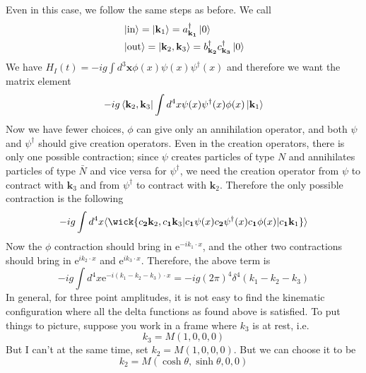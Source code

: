 \documentclass[11pt]{article}
\newcommand{\e}{\mathrm{e}}
\newcommand{\adag}[1]{a^\dagger_\mathbf{#1}}
\newcommand{\bdag}[1]{b^\dagger_\mathbf{#1}}
\renewcommand{\c}[1]{c_\mathbf{#1}}
\newcommand{\cdag}[1]{c^\dagger_\mathbf{#1}}
\numberwithin{equation}{section}
\begin{document}
    Even in this case, we follow the same steps as before. We call
    \begin{align*}
        &\ket{\text{in}} = \ket{\textbf{k}_1} = \adag{k_1}\ket{0}\\
        &\ket{\text{out}} = \ket{\textbf{k}_2, \textbf{k}_3} = \bdag{k_2}\cdag{k_3}\ket{0}
    \end{align*} 
    We have \(H_I(t) = -ig\int d^3\textbf{x} \phi(x) \psi(x) \psi^\dagger(x)\) and therefore we want the matrix element 
    \begin{equation*}
        -ig \bra{\textbf{k}_2, \textbf{k}_3} \int d^4x  \psi(x) \psi^\dagger(x) \phi(x) \ket{\textbf{k}_1} 
    \end{equation*}
    Now we have fewer choices, \(\phi\) can give only an annihilation operator, and both \(\psi\) and \(\psi^\dagger\) should give creation operators. Even in the creation operators, there is only one possible contraction; since \(\psi\) creates particles of type \(N\) and annihilates particles of type \(\bar{N}\) and vice versa for \(\psi^\dagger\), we need the creation operator from \(\psi\) to contract with \(\textbf{k}_3\) and from \(\psi^\dagger\) to contract with \(\textbf{k}_2\). Therefore the only possible contraction is the following 
    \begin{equation*}
        -ig \int d^4x \langle \wick{\c2{\mathbf{k}_2},\c1{\mathbf{k}_3}| \c1 \psi(x) \c2 \psi^\dagger(x) \c1 \phi(x) | \c1{\mathbf{k}_1}}\rangle 
    \end{equation*}
    Now the \(\phi\) contraction should bring in \(\e^{-ik_1\cdot x}\), and the other two contractions should bring in \(\e^{ik_2\cdot x}\) and \(\e^{ik_3\cdot x}\). Therefore, the above term is 
    \begin{equation*}
        -ig \int d^4 x \e^{-i(k_1 - k_2 - k_3)\cdot x} = -ig(2\pi)^4 \delta^4(k_1 - k_2 - k_3)
    \end{equation*}
    In general, for three point amplitudes, it is not easy to find the kinematic configuration where all the delta functions as found above is satisfied. To put things to picture, suppose you work in a frame where \(k_3\) is at rest, i.e. 
    \begin{equation*}
        k_3 = M(1,0,0,0)
    \end{equation*}
    But I can't at the same time, set \(k_2 = M(1,0,0,0)\). But we can choose it to be 
    \begin{equation*}
        k_2 = M(\cosh\theta, \sinh\theta, 0, 0)
    \end{equation*} 
\end{document}
